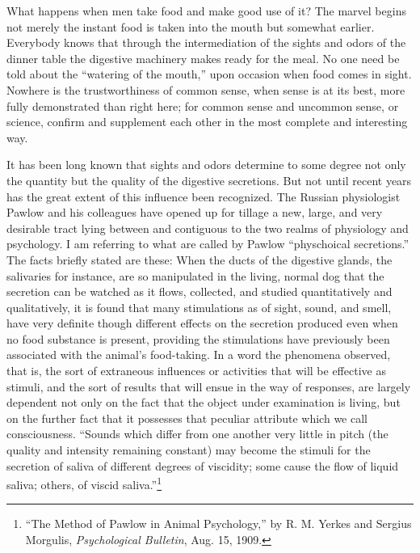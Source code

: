 \documentclass[a4paper, 11pt, oneside, polutonikogreek, english, landscape]{article}
\begin{document}
What happens when men take food and make good use of it? The marvel begins not merely the instant food is taken into the mouth but somewhat earlier. Everybody knows that through the intermediation of the sights and odors of the dinner table the digestive machinery makes ready for the meal. No one need be told about the ``watering of the mouth,'' upon occasion when food comes in sight. Nowhere is the trustworthiness of common sense, when sense is at its best, more fully demonstrated than right here; for common sense and uncommon sense, or science, confirm and supplement each other in the most complete and interesting way.

It has been long known that sights and odors determine to some degree not only the quantity but the quality of the digestive secretions. But not until recent years has the great extent of this influence been recognized. The Russian physiologist Pawlow and his colleagues have opened up for tillage a new, large, and very desirable tract lying between and contiguous to the two realms of physiology and psychology. I am referring to what are called by Pawlow ``physchoical secretions.'' The facts briefly stated are these: When the ducts of the digestive glands, the salivaries for instance, are so manipulated in the living, normal dog that the secretion can be watched as it flows, collected, and studied quantitatively and qualitatively, it is found that many stimulations as of sight, sound, and smell, have very definite though different effects on the secretion produced even when no food substance is present, providing the stimulations have previously been associated with the animal's food-taking. In a word the phenomena observed, that is, the sort of extraneous influences or activities that will be effective as stimuli, and the sort of results that will ensue in the way of responses, are largely dependent not only on the fact that the object under examination is living, but on the further fact that it possesses that peculiar attribute which we call consciousness. ``Sounds which differ from one another very little in pitch (the quality and intensity remaining constant) may become the stimuli for the secretion of saliva of different degrees of viscidity; some cause the flow of liquid saliva; others, of viscid saliva.''\footnote{``The Method of Pawlow in Animal Psychology,'' by R. M. Yerkes and Sergius Morgulis, \emph{Psychological Bulletin}, Aug. 15, 1909.}
\end{document}
